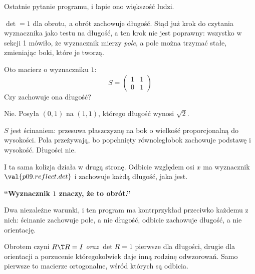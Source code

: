 \begin{fr}
Ostatnie pytanie programu, i łapie ono większość ludzi.

$\det = 1$ dla obrotu, a obrót zachowuje długość. Stąd już krok do czytania
wyznacznika jako testu na długość, a ten krok nie jest poprawny: wszystko w
sekcji 1 mówiło, że wyznacznik mierzy \emph{pole}, a pole można trzymać stałe,
zmieniając boki, które je tworzą.

Oto macierz o wyznaczniku $1$:
\[ S = \begin{pmatrix} 1 & 1 \\ 0 & 1 \end{pmatrix} \]
Czy zachowuje ona długość?
\dotline
\nextframe
\end{fr}

\begin{fr}
\begin{ansblock}
Nie. Posyła $(0,1)$ na $(1,1)$, którego długość wynosi $\sqrt{2}$.
\end{ansblock}

$S$ jest ścinaniem: przesuwa płaszczyznę na bok o wielkość proporcjonalną do
wysokości. Pola przeżywają, bo popchnięty równoległobok zachowuje podstawę i
wysokość. Długości nie.

I ta sama kolizja działa w drugą stronę. Odbicie względem osi $x$ ma wyznacznik
$\val{p09.reflect.det}$ i zachowuje każdą długość, jaka jest.
\end{fr}

\begin{trapbox}
\textbf{\enquote{Wyznacznik $1$ znaczy, że to obrót.}}

Dwa niezależne warunki, i ten program ma kontrprzykład przeciwko każdemu z
nich: ścinanie zachowuje pole, a nie długość, odbicie zachowuje długość, a nie
orientację.

Obrotem czyni $R\T R = I$ \emph{oraz} $\det R = 1$ \dash{} pierwsze dla
długości, drugie dla orientacji \dash{} a porzucenie któregokolwiek daje inną
rodzinę odwzorowań. Samo pierwsze to macierze ortogonalne, wśród których są
odbicia.
\end{trapbox}

